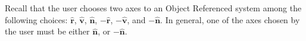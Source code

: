 {%

Recall that the user chooses two axes to  an Object Referenced
system among the following choices:   $\hat{\mathbf{r}}$,
$\hat{\mathbf{v}}$, $\hat{\mathbf{n}}$,  $-\hat{\mathbf{r}}$,
$-\hat{\mathbf{v}}$, and $-\hat{\mathbf{n}}$.  In general, one of
the axes chosen by the user must be either $\hat{\mathbf{n}}$, or
$-\hat{\mathbf{n}}$.


}
